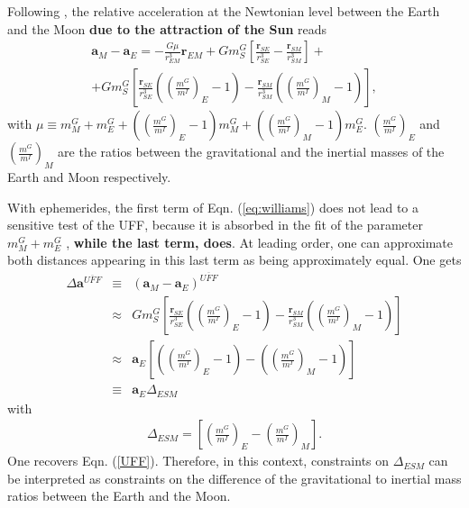 \documentclass[fleqn,usenatbib,referee]{mnras}
\begin{document}
Following \cite{Williams2012}, the relative acceleration at the Newtonian level between the Earth and the Moon \textbf{due to the attraction of the Sun} reads
\begin{eqnarray}
\bm a_M - \bm a_E= -  \frac{ G \mu}{r_{EM}^3}\bm r_{EM}+   G m^G_S\left[ \frac{\bm r_{SE}}{r_{SE}^3}-\frac{\bm r_{SM}}{r_{SM}^3} \right] + \nonumber \\
+   G  m^G_S\left[ \frac{\bm r_{SE}}{r_{SE}^3} \left(\left(\frac{m^G}{m^I} \right)_E -1\right)- \frac{\bm r_{SM}}{r_{SM}^3} \left(\left(\frac{m^G}{m^I} \right)_M -1\right) \right], \label{eq:williams}
\end{eqnarray}
with $\mu\equiv  m^G_M +  m^G_E+ \left(\left(\frac{m^G}{m^I} \right)_E -1\right)m^G_M+\left(\left(\frac{m^G}{m^I} \right)_M -1\right) m^G_E$. $\left(\frac{m^G}{m^I} \right)_E$ and $\left(\frac{m^G}{m^I} \right)_M$ are the ratios between the gravitational and the inertial masses of the Earth and Moon respectively.

With ephemerides, the first term of Eqn. (\ref{eq:williams}) does not lead to a sensitive test of the UFF, because it is absorbed in the fit of the parameter $m^G_M+m^G_E$ \citep[e.g.]{Williams2012}, \textbf{while the last term, does}. At leading order, one can approximate both distances appearing in this last term as being approximately equal. One gets
\begin{eqnarray}
\Delta \bm a^{\overline{UFF}} &\equiv& (\bm a_M - \bm a_E)^{\overline{UFF}} \nonumber \\
&\approx&  G m^G_S\left[ \frac{\bm r_{SE}}{r_{SE}^3} \left(\left(\frac{m^G}{m^I} \right)_E -1\right)- \frac{\bm r_{SM}}{r_{SM}^3} \left(\left(\frac{m^G}{m^I} \right)_M -1\right) \right]\nonumber \\
&\approx&  \bm a_{E}\left[ \left(\left(\frac{m^G}{m^I} \right)_E -1\right)-  \left(\left(\frac{m^G}{m^I} \right)_M -1\right) \right] \nonumber \\
&\equiv& \bm a_{E} \Delta_{ESM}
\end{eqnarray}
with
\begin{eqnarray}
\Delta_{ESM} =\left[\left(\frac{m^G}{m^I} \right)_E-  \left(\frac{m^G}{m^I} \right)_M \right].\label{eq:Delta_usual}
\end{eqnarray}
One recovers Eqn. (\ref{UFF}). Therefore, in this context, constraints on $\Delta_{ESM}$ can be interpreted as constraints on the difference of the gravitational to inertial mass ratios between the Earth and the Moon. 
\end{document}
